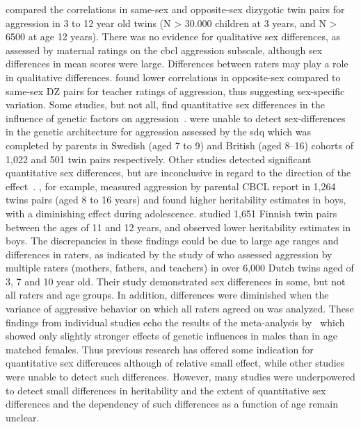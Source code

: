 \citet{Vink2012} compared the correlations in same-sex and opposite-sex dizygotic twin pairs for aggression in 3 to 12 year old twins (N > 30.000 children at 3 years, and N > 6500 at age 12 years).
There was no evidence for qualitative sex differences, as assessed by maternal ratings on the \acrfull{cbcl} aggression subscale, although sex differences in mean scores were large.
Differences between raters may play a role in qualitative differences.
\citet{Vierikko2003} found lower correlations in opposite-sex compared to same-sex DZ pairs for teacher ratings of aggression, thus suggesting sex-specific variation.  
Some studies, but not all, find quantitative sex differences in the influence of genetic factors on aggression~\cite{Cadoret1995, Eley1999, Rhee2002}.
\citet{Eley1999} were unable to detect sex-differences in the genetic architecture for aggression assessed by the \acrfull{sdq} which was completed by parents in Swedish (aged 7 to 9) and British (aged 8--16) cohorts of 1,022 and 501 twin pairs respectively.
Other studies detected significant quantitative sex differences, but are inconclusive in regard to the direction of the effect~\cite{Silberg1994, Miles1997, Vierikko2003, vanBeijsterveldt2003}.
\citet{Silberg1994}, for example, measured aggression by parental CBCL report in 1,264 twins pairs (aged 8 to 16 years) and found higher heritability estimates in boys, with a diminishing effect during adolescence.
\citet{Vierikko2003} studied 1,651 Finnish twin pairs between the ages of 11 and 12 years, and observed lower heritability estimates in boys.
The discrepancies in these findings could be due to large age ranges and differences in raters, as indicated by the study of \citet{Hudziak2003} who assessed aggression by multiple raters (mothers, fathers, and teachers) in over 6,000 Dutch twins aged of 3, 7 and 10 year old.
Their study demonstrated sex differences in some, but not all raters and age groups.
In addition, differences were diminished when the variance of aggressive behavior on which all raters agreed on was analyzed.
These findings from individual studies echo the results of the meta-analysis by~\citet{Miles1997} which showed only slightly stronger effects of genetic influences in males than in age matched females.
Thus previous research has offered some indication for quantitative sex differences although of relative small effect, while other studies were unable to detect such differences.
However, many studies were underpowered to detect small differences in heritability and the extent of quantitative sex differences and the dependency of such differences as a function of age remain unclear.  
